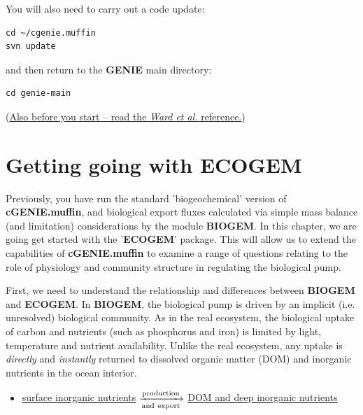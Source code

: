 \documentclass[11pt,fleqn]{book} %
\begin{document}
\noindent You will also need to carry out a code update:

\vspace{-2mm}
\small\begin{verbatim}
cd ~/cgenie.muffin
svn update
\end{verbatim}\normalsize
\vspace{-2mm}

\noindent and then return to the \textbf{GENIE} main directory:

\vspace{-2mm}
\small\begin{verbatim}
cd genie-main
\end{verbatim}\normalsize
\vspace{-2mm}

\noindent (\uline{Also before you start -- read the \textit{Ward et al.} reference.})


\newpage


\section{Getting going with ECOGEM}

Previously, you have run the standard 'biogeochemical' version of \textbf{cGENIE.muffin}, and biological export fluxes calculated via simple mass balance (and limitation) considerations by the module \textbf{BIOGEM}. In this chapter, we are going get started with the '\textbf{ECOGEM}' package. This will allow us to extend the capabilities of \textbf{cGENIE.muffin} to examine a range of questions relating to the role of physiology and community structure in regulating the biological pump. 

First, we need to understand the relationship and differences between \textbf{BIOGEM} and \textbf{ECOGEM}. 
In \textbf{BIOGEM}, the biological pump is driven by an implicit (i.e. unresolved) biological community. As in the real ecosystem, the biological uptake of carbon and nutrients (such as phosphorus and iron) is limited by light, temperature and nutrient availability. Unlike the real ecosystem, any uptake is \textit{directly} and \textit{instantly} returned to dissolved organic matter (DOM) and inorganic nutrients in the ocean interior.

\vspace{4mm}
\begin{itemize}
\item \underline{surface inorganic nutrients} $\xrightarrow[\rm and~export]{\rm production}$ \underline{DOM and deep inorganic nutrients}
\end{itemize}
\vspace{4mm}
\end{document}
